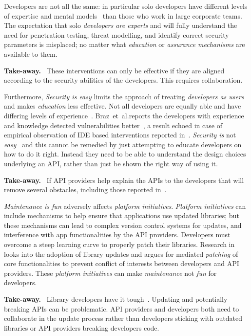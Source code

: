 \documentclass[conference]{IEEEtran}
\newenvironment{finding}{\begin{framed}\noindent\textbf{Take-away.}~}{\end{framed}}
\newcommand{\etal}[0]{et~al{.}}
\begin{document}
Developers are not all the same: in particular 
solo developers have different levels of expertise and mental models~\cite{acarusability2017,joseph2021} than those who work in large corporate teams. The expectation that solo \emph{developers are experts} and will fully understand the need for penetration testing, threat modelling, and identify correct security parameters is misplaced; no matter what \emph{education} or \emph{assurance mechanisms} are available to them.
\begin{finding}\noindent 
These interventions can only be effective if they are aligned according to the security abilities of the developers. This requires collaboration. 
\end{finding}


Furthermore,
\emph{Security is easy} limits the approach of treating \emph{developers as users} and makes \emph{education} less effective. Not all developers are equally able and have differing levels of experience~\cite{zhuaside2013,braz2021}. Braz~\etal reports the developers with experience and knowledge detected vulnerabilities better~\cite{braz2021}, a result echoed in case of empirical observation of IDE based interventions reported in~\cite{aside2012}. \emph{Security is} not \emph{easy}~\cite{oltrogge2018rise} and this cannot be remedied by just attempting to educate developers on how to do it right. Instead they need to be able to understand the design choices underlying an API, rather than just be shown the right way of using it.
\begin{finding}
\noindent  
If API providers help explain the APIs to the developers that will remove several obstacles, including those reported in~\cite{nadijava2016,acar2016infosources}.  
\end{finding}

\emph{Maintenance is fun} adversely affects \emph{platform initiatives}. \emph{Platform initiatives} can include mechanisms to help ensure that applications use updated libraries; but these mechanisms can lead to complex version control systems for updates, and interference with app functionalities by the API providers. Developers must overcome a steep learning curve to properly patch their libraries. Research in~\cite{erikacar2017} looks into the adoption of library updates and argues for mediated \emph{patching} of core functionalities to prevent conflict of interests between developers and API providers. These \emph{platform initiatives} can make \emph{maintenance} not \emph{fun} for developers.
\begin{finding}
\noindent
Library developers have it tough~\cite{hartman2021nontechnical}. 
Updating and potentially breaking APIs can be problematic.
API providers and developers both need to collaborate in the update process rather than developers sticking with outdated libraries or API providers breaking developers code.  
\end{finding}
\end{document}
